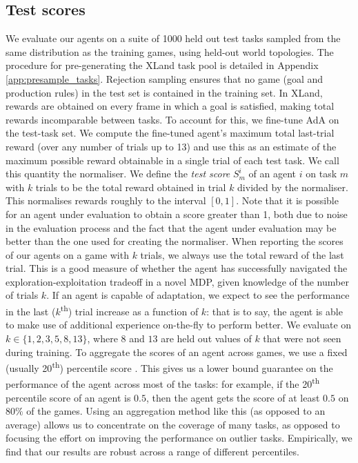 \documentclass[11pt, a4paper, logo, copyright]{deepmind}
\begin{document}
\begin{appendix}
\subsection{Test scores} We evaluate our agents on a suite of 1000 held out test tasks  sampled from the same distribution as the training games, using held-out world topologies. The procedure for pre-generating the XLand task pool is detailed in Appendix \ref{app:presample_tasks}. Rejection sampling ensures that no game (goal and production rules) in the test set is contained in the training set.
In XLand, rewards are obtained on every frame in which a goal is satisfied, making total rewards incomparable between tasks. To account for this, we fine-tune AdA on the test-task set. We compute the fine-tuned agent's maximum total last-trial reward
(over any number of trials up to 13)
and use this as an estimate of the maximum possible reward obtainable in a single trial of each test task. We call this quantity the normaliser. We define the \textit{test score} $S^i_m$ of an agent $i$ on task $m$ with $k$ trials to be the total reward obtained in trial $k$ divided by the normaliser. This normalises rewards roughly to the interval $[0, 1]$. Note that it is possible for an agent under evaluation to obtain a score greater than 1, both due to noise in the evaluation process and the fact that the agent under evaluation may be better than the one used for creating the normaliser.
When reporting the scores of our agents on a game with $k$ trials, we always use the total reward of the last trial. This is a good measure of whether the agent has successfully navigated the exploration-exploitation tradeoff in a novel MDP, given knowledge of the number of trials $k$. If an agent is capable of adaptation, we expect to see the performance in the last ($k$\textsuperscript{th}) trial increase as a function of $k$: that is to say, the agent is able to make use of additional experience on-the-fly to perform better. We evaluate on $k \in \{1, 2, 3, 5, 8, 13\}$, where $8$ and $13$ are held out values of $k$ that were not seen during training.
To aggregate the scores of an agent across games, we use a fixed (usually 20\textsuperscript{th}) percentile score \citep{DBLP:journals/corr/abs-2108-13264}. This gives us a lower bound guarantee on the performance of the agent across most of the tasks: for example, if the 20\textsuperscript{th} percentile score of an agent is $0.5$, then the agent gets the score of at least $0.5$ on $80\%$ of the games. Using an aggregation method like this (as opposed to an average) allows us to concentrate on the coverage of many tasks, as opposed to focusing the effort on improving the performance on outlier tasks. Empirically, we find that our results are robust across a range of different percentiles.

\end{appendix}
\end{document}
